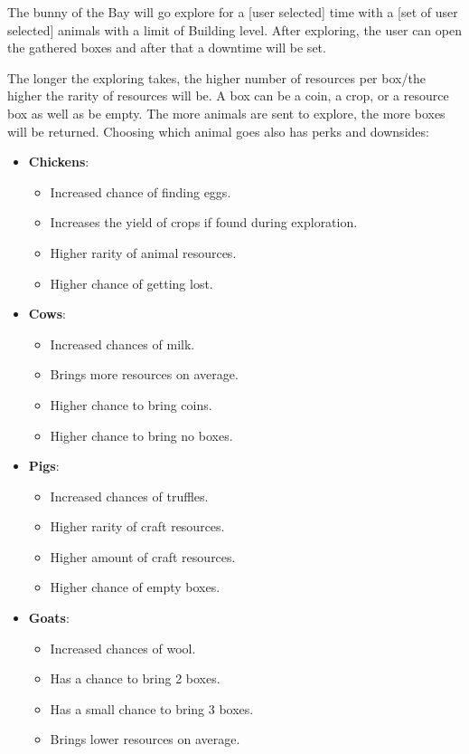 \documentclass[12pt]{article}
\begin{document}
The bunny of the Bay will go explore for a [user selected] time with a [set of user selected] animals with a limit of Building level. After exploring, the user can open the gathered boxes and after that a downtime will be set.

The longer the exploring takes, the higher number of resources per box/the higher the rarity of resources will be. A box can be a coin, a crop, or a resource box as well as be empty. The more animals are sent to explore, the more boxes will be returned. Choosing which animal goes also has perks and downsides:

\begin{itemize}
\item \textbf{Chickens}:
\begin{itemize}
\item Increased chance of finding eggs.
\item Increases the yield of crops if found during exploration.
\item Higher rarity of animal resources.
\item Higher chance of getting lost.
\end{itemize}
\item \textbf{Cows}:
\begin{itemize}
    \item Increased chances of milk.
    \item Brings more resources on average.
    \item Higher chance to bring coins.
    \item Higher chance to bring no boxes.
\end{itemize}

\item \textbf{Pigs}:
\begin{itemize}
    \item Increased chances of truffles.
    \item Higher rarity of craft resources.
    \item Higher amount of craft resources.
    \item Higher chance of empty boxes.
\end{itemize}

\item \textbf{Goats}:
\begin{itemize}
    \item Increased chances of wool.
    \item Has a chance to bring 2 boxes.
    \item Has a small chance to bring 3 boxes.
    \item Brings lower resources on average.
\end{itemize}
\end{itemize}
\end{document}
